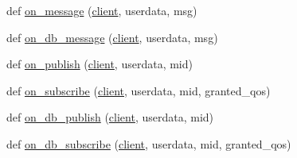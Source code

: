 \begin{DoxyCompactItemize}
def \hyperlink{namespaceflexIDMnger_ab4402465dd325fa7090293b438150f64}{on\+\_\+message} (\hyperlink{namespaceflexIDMnger_a14d9378e3d8a87b7ff6a7dad2fd1b6c6}{client}, userdata, msg)
\item 
def \hyperlink{namespaceflexIDMnger_afe56cc6ed0dfca7472d466474520a4ca}{on\+\_\+db\+\_\+message} (\hyperlink{namespaceflexIDMnger_a14d9378e3d8a87b7ff6a7dad2fd1b6c6}{client}, userdata, msg)
\item 
def \hyperlink{namespaceflexIDMnger_ac3b53feda9816f03d96d73ec08657a94}{on\+\_\+publish} (\hyperlink{namespaceflexIDMnger_a14d9378e3d8a87b7ff6a7dad2fd1b6c6}{client}, userdata, mid)
\item 
def \hyperlink{namespaceflexIDMnger_aa440eb79190d2e914d460ae1f99e6418}{on\+\_\+subscribe} (\hyperlink{namespaceflexIDMnger_a14d9378e3d8a87b7ff6a7dad2fd1b6c6}{client}, userdata, mid, granted\+\_\+qos)
\item 
def \hyperlink{namespaceflexIDMnger_a649fcecdc02f23be2733fac4616acfae}{on\+\_\+db\+\_\+publish} (\hyperlink{namespaceflexIDMnger_a14d9378e3d8a87b7ff6a7dad2fd1b6c6}{client}, userdata, mid)
\item 
def \hyperlink{namespaceflexIDMnger_a7ecd528167e56a9c7e90dfe70cf45c0d}{on\+\_\+db\+\_\+subscribe} (\hyperlink{namespaceflexIDMnger_a14d9378e3d8a87b7ff6a7dad2fd1b6c6}{client}, userdata, mid, granted\+\_\+qos)
\end{DoxyCompactItemize}
